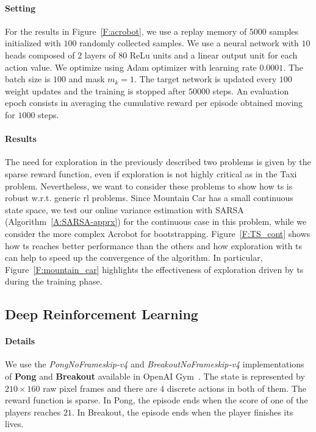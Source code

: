 \paragraph{Setting} For the results in Figure~\ref{F:acrobot}, we use a replay memory of $5000$ samples initialized with $100$ randomly collected samples. We use a neural network with $10$ heads composed of $2$ layers of $80$ ReLu units and a linear output unit for each action value. We optimize using Adam optimizer with learning rate $0.0001$. The batch size is $100$ and mask $m_k = 1$. The target network is updated every $100$ weight updates and the training is stopped after $50000$ steps. An evaluation epoch consists in averaging the cumulative reward per episode obtained moving for $1000$ steps.

\paragraph{Results} The need for exploration in the previously described two problems is given by the sparse reward function, even if exploration is not highly critical as in the Taxi problem. Nevertheless, we want to consider these problems to show how \gls{ts} is robust w.r.t. generic \gls{rl} problems. Since Mountain Car has a small continuous state space, we test our online variance estimation with SARSA (Algorithm~\ref{A:SARSA-apprx}) for the continuous case in this problem, while we consider the more complex Acrobot for bootstrapping. Figure~\ref{F:TS_cont} shows how \gls{ts} reaches better performance than the others and how exploration with \gls{ts} can help to speed up the convergence of the algorithm. In particular, Figure~\ref{F:mountain_car} highlights the effectiveness of exploration driven by \gls{ts} during the training phase.

\subsection{Deep Reinforcement Learning}\label{S:exploration_drl}
\paragraph{Details} We use the \textit{PongNoFrameskip-v4} and \textit{BreakoutNoFrameskip-v4} implementations of \textbf{Pong} and \textbf{Breakout} available in OpenAI Gym~\cite{gym}. The state is represented by $210 \times 160$ raw pixel frames and there are $4$ discrete actions in both of them. The reward function is sparse. In Pong, the episode ends when the score of one of the players reaches $21$. In Breakout, the episode ends when the player finishes its lives.
